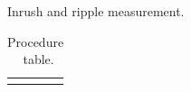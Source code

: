 \begin{stepstable}{\subprocid{} Inrush and ripple measurement.}
		\CopyCegseLogsForEvicences{\subprocid}{}
		\CopyOscilloscopeScreenShotsForEvidences
		\GetTempAndHumidityFromDatalogger

		\RegisterTempAndHumidity
		\ClosePXISA
		\ConnectMeasurementProbesToAdHocBoxForXBand	
	


\end{stepstable}
\begin{longtable}{|p{17.0cm}|}
	\endfirsthead
	\endfoot
	\caption{Procedure \subprocid \ table.} \label{tb:proc:018-02}
\end{longtable}
